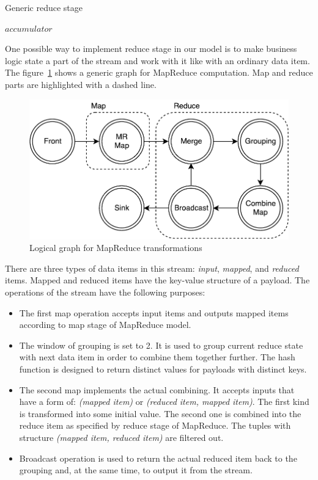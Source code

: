 \begin{algorithm}
\caption{Generic reduce stage}
\label{reduce}
\begin{algorithmic}
    \State $accumulator$ 
      \State {}
    \EndFor
    \State {}
  \EndFunction
\end{algorithmic}
\end{algorithm}

One possible way to implement reduce stage in our model is to make business logic state a part of the stream and work with it like with an ordinary data item. The figure~\ref{mapreduce-graph-figure} shows a generic graph for MapReduce computation. Map and reduce parts are highlighted with a dashed line.

\begin{figure}[htb]
  \centering
  \includegraphics[scale=0.5]{pics/mapreduce}
  \caption{Logical graph for MapReduce transformations}
  \label {mapreduce-graph-figure}
\end{figure}

There are three types of data items in this stream: {\it input}, {\it mapped}, and {\it reduced} items. Mapped and reduced items have the key-value structure of a payload. The operations of the stream have the following purposes:

\begin{itemize}
  \item The first map operation accepts input items and outputs mapped items according to map stage of MapReduce model.
  \item The window of grouping is set to 2. It is used to group current reduce state with next data item in order to combine them together further. The hash function is designed to return distinct values for payloads with distinct keys.
  \item The second map implements the actual combining. It accepts inputs that have a form of: \textit{(mapped item)} or \textit{(reduced item, mapped item)}. The first kind is transformed into some initial value. The second one is combined into the reduce item as specified by reduce stage of MapReduce. The tuples with structure \textit{(mapped item, reduced item)} are filtered out.
  \item Broadcast operation is used to return the actual reduced item back to the grouping and, at the same time, to output it from the stream. 
\end{itemize}


